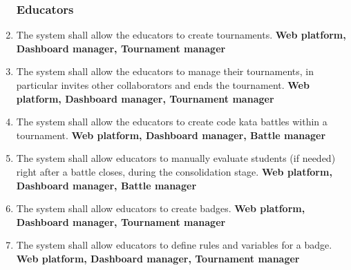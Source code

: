 \begin{enumerate}[label=\textbf{R.\arabic*}]
    \subsubsection*{Educators}
    \item {} {The system shall allow the educators to create tournaments.} \newline
    \textbf{Web platform, Dashboard manager, Tournament manager}
    \item {} {The system shall allow the educators to manage their tournaments, in particular invites other collaborators and ends the tournament.} \newline
    \textbf{Web platform, Dashboard manager, Tournament manager}
    \item {} {The system shall allow the educators to create code kata battles within a tournament.} \newline
    \textbf{Web platform, Dashboard manager, Battle manager}
     \item {} {The system shall allow educators to manually evaluate students (if needed) right after a battle closes, during the consolidation stage.} \newline
     \textbf{Web platform, Dashboard manager, Battle manager}
    \item {} {The system shall allow educators to create badges.} \newline
    \textbf{Web platform, Dashboard manager, Tournament manager}
    \item {} {The system shall allow educators to define rules and variables for a badge.} \newline
    \textbf{Web platform, Dashboard manager, Tournament manager}


\end{enumerate}
